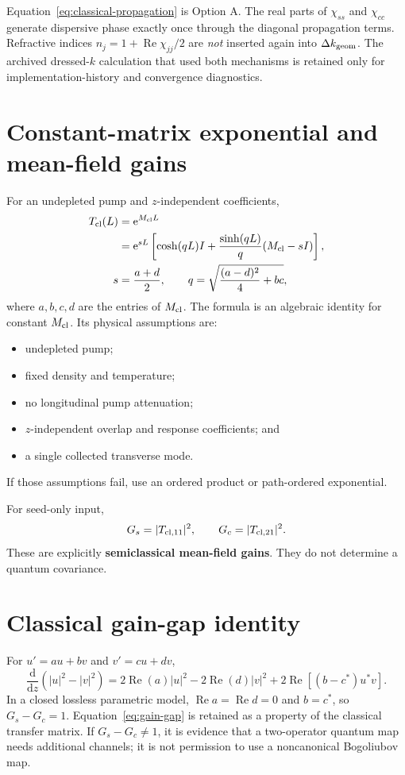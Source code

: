 \documentclass[11pt,a4paper]{article}
\newcommand{\dd}{\mathrm d}
\newcommand{\e}{\mathrm e}
\newcommand{\Rea}{\operatorname{Re}}
\begin{document}
Equation~\eqref{eq:classical-propagation} is Option A. The real parts of
$\chi_{ss}$ and $\chi_{cc}$ generate dispersive phase exactly once through the
diagonal propagation terms. Refractive indices
$n_j=1+\Rea\chi_{jj}/2$ are \emph{not} inserted again into
$\Delta k_{\rm geom}$. The archived dressed-$k$ calculation that used both
mechanisms is retained only for implementation-history and convergence
diagnostics.

\section{Constant-matrix exponential and mean-field gains}

For an undepleted pump and $z$-independent coefficients,
\begin{align}
T_{\rm cl}(L)&=\e^{M_{\rm cl}L}\nonumber\\
&=\e^{sL}\left[
\cosh(qL)I+\frac{\sinh(qL)}q(M_{\rm cl}-sI)\right],\\
s&=\frac{a+d}{2},\qquad
q=\sqrt{\frac{(a-d)^2}{4}+bc},
\label{eq:matrix-exponential}
\end{align}
where $a,b,c,d$ are the entries of $M_{\rm cl}$. The formula is an algebraic
identity for constant $M_{\rm cl}$. Its physical assumptions are:
\begin{itemize}
\item undepleted pump;
\item fixed density and temperature;
\item no longitudinal pump attenuation;
\item $z$-independent overlap and response coefficients; and
\item a single collected transverse mode.
\end{itemize}
If those assumptions fail, use an ordered product or path-ordered exponential.

For seed-only input,
\begin{equation}
G_s=|T_{{\rm cl},11}|^2,\qquad
G_c=|T_{{\rm cl},21}|^2 .
\label{eq:mean-field-gains}
\end{equation}
These are explicitly \textbf{semiclassical mean-field gains}. They do not
determine a quantum covariance.

\section{Classical gain-gap identity}

For $u'=au+bv$ and $v'=cu+dv$,
\begin{equation}
\frac{\dd}{\dd z}(|u|^2-|v|^2)
=2\Rea(a)|u|^2-2\Rea(d)|v|^2
+2\Rea[(b-c^*)u^*v].
\label{eq:gain-gap}
\end{equation}
In a closed lossless parametric model,
$\Rea a=\Rea d=0$ and $b=c^*$, so $G_s-G_c=1$.
Equation~\eqref{eq:gain-gap} is retained as a property of the classical
transfer matrix. If $G_s-G_c\ne1$, it is evidence that a two-operator quantum
map needs additional channels; it is not permission to use a noncanonical
Bogoliubov map.
\end{document}
